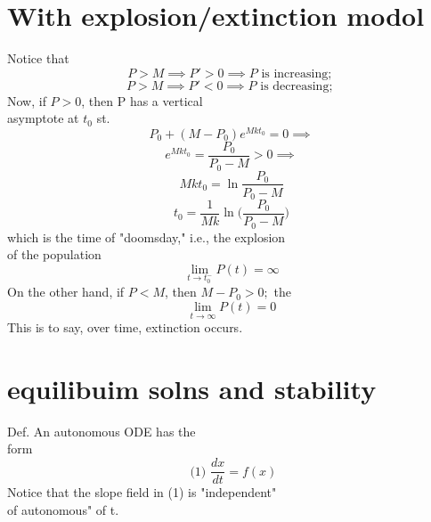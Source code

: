 \section{With explosion/extinction modol}
  Notice that 
  \[ P>M \implies P'>0 \implies P \text{ is increasing; } \]
  \[ P>M \implies P'<0 \implies P \text{ is decreasing; } \]
  Now, if \( P>0 \), then P has a vertical \\
  asymptote at \( t_0 \) st. 
  \[ P_0 + (M-P_0)e^{Mkt_0} = 0 \implies \]
  \[ e^{Mkt_0} = \frac{P_0}{P_0 - M}>0 \implies \]
  \[ Mkt_0 = \ln \frac{P_0}{P_0-M} \]
  \[ \boxed{t_0 = \frac{1}{Mk} \ln \bigg( \frac{P_0}{P_0-M} \bigg)} \]
  which is the time of "doomsday," i.e., the explosion \\
  of the population \\ 
  \[ \lim_{t \to t_0^-} P(t) = \infty \]
  On the other hand, if \( P<M \), then \( M-P_0>0; \) the
  \[ \lim_{t \to \infty} P(t) = 0 \]
  This is to say, over time, extinction occurs. 


  \newpage 
\section*{equilibuim solns and stability}
  Def. An autonomous ODE has the \\
  form 
  \[ \text{ (1) } \frac{dx}{dt} = f(x) \]
  Notice that the slope field in (1) is "independent" \\
  of autonomous" of t. \\
